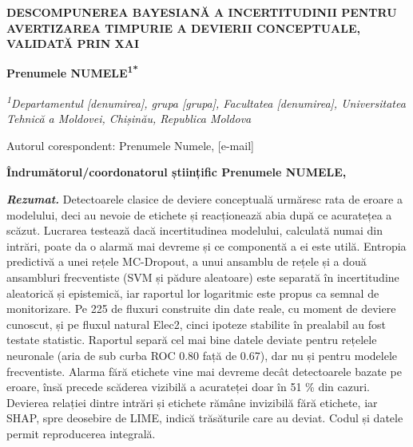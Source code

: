 \documentclass[12pt,a4paper]{article}
\begin{document}
\raggedbottom
\begin{center}
{\fontsize{14}{16}\selectfont\bfseries DESCOMPUNEREA BAYESIANĂ A INCERTITUDINII PENTRU AVERTIZAREA TIMPURIE A DEVIERII CONCEPTUALE, VALIDATĂ PRIN XAI\par}
\vspace{12pt}
{\bfseries Prenumele NUMELE\textsuperscript{1*}\par}
\vspace{10pt}
{\fontsize{10}{12}\selectfont\itshape \textsuperscript{1}Departamentul [denumirea], grupa [grupa], Facultatea [denumirea], Universitatea Tehnică a Moldovei, Chișinău, Republica Moldova\par}
\vspace{10pt}
{\fontsize{10}{12}\selectfont *Autorul corespondent: Prenumele Numele, [e-mail]\par}
\vspace{10pt}
{\fontsize{10}{12}\selectfont\bfseries Îndrumătorul/coordonatorul științific \normalsize Prenumele NUMELE\fontsize{10}{12}\selectfont, \par}
\end{center}
\vspace{6pt}

{\itshape\let\emph\textit

\noindent \textbf{\emph{Rezumat.}} Detectoarele clasice de deviere
conceptuală urmăresc rata de eroare a modelului, deci au nevoie de
etichete și reacționează abia după ce acuratețea a scăzut. Lucrarea
testează dacă incertitudinea modelului, calculată numai din intrări,
poate da o alarmă mai devreme și ce componentă a ei este utilă. Entropia
predictivă a unei rețele MC-Dropout, a unui ansamblu de rețele și a două
ansambluri frecventiste (SVM și pădure aleatoare) este separată în
incertitudine aleatorică și epistemică, iar raportul lor logaritmic este
propus ca semnal de monitorizare. Pe 225 de fluxuri construite din date
reale, cu moment de deviere cunoscut, și pe fluxul natural Elec2, cinci
ipoteze stabilite în prealabil au fost testate statistic. Raportul
separă cel mai bine datele deviate pentru rețelele neuronale (aria de
sub curba ROC 0.80 față de 0.67), dar nu și pentru modelele
frecventiste. Alarma fără etichete vine mai devreme decât detectoarele
bazate pe eroare, însă precede scăderea vizibilă a acurateței doar în 51
\% din cazuri. Devierea relației dintre intrări și etichete rămâne
invizibilă fără etichete, iar SHAP, spre deosebire de LIME, indică
trăsăturile care au deviat. Codul și datele permit reproducerea
integrală.

\par}
\end{document}
